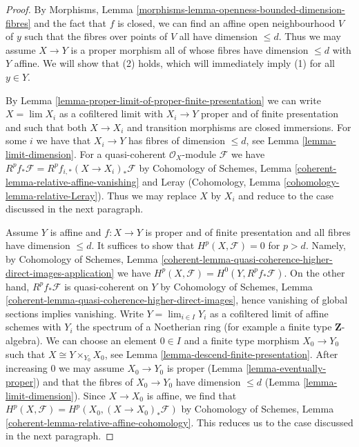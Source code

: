 \documentclass[10pt,a4paper]{amsart}
\theoremstyle{plain}
\theoremstyle{definition}
\theoremstyle{remark}
\numberwithin{equation}{subsection}
\def\lim{\mathop{\mathrm{lim}}\nolimits}
\begin{document}
\begin{proof}
By Morphisms, Lemma
\ref{morphisms-lemma-openness-bounded-dimension-fibres}
and the fact that $f$ is closed, we can find an affine open neighbourhood
$V$ of $y$ such that the fibres over points of $V$ all have dimension
$\leq d$. Thus we may assume $X \to Y$ is a proper morphism all
of whose fibres have dimension $\leq d$ with $Y$ affine.
We will show that (2) holds, which will immediately imply (1)
for all $y \in Y$.

\medskip\noindent
By Lemma \ref{lemma-proper-limit-of-proper-finite-presentation}
we can write $X = \lim X_i$ as a cofiltered limit with $X_i \to Y$ proper
and of finite presentation and such that both $X \to X_i$
and transition morphisms are closed immersions.
For some $i$ we have that $X_i \to Y$ has fibres of dimension $\leq d$,
see Lemma \ref{lemma-limit-dimension}.
For a quasi-coherent $\mathcal{O}_X$-module $\mathcal{F}$ we have
$R^pf_*\mathcal{F} = R^pf_{i, *}(X \to X_i)_*\mathcal{F}$ by
Cohomology of Schemes, Lemma \ref{coherent-lemma-relative-affine-vanishing}
and Leray (Cohomology, Lemma \ref{cohomology-lemma-relative-Leray}).
Thus we may replace $X$ by $X_i$ and
reduce to the case discussed in the next paragraph.

\medskip\noindent
Assume $Y$ is affine and $f : X \to Y$ is proper and of finite presentation
and all fibres have dimension $\leq d$. It suffices to show that
$H^p(X, \mathcal{F}) = 0$ for $p > d$. Namely, by
Cohomology of Schemes, Lemma
\ref{coherent-lemma-quasi-coherence-higher-direct-images-application}
we have $H^p(X, \mathcal{F}) = H^0(Y, R^pf_*\mathcal{F})$.
On the other hand, $R^pf_*\mathcal{F}$ is quasi-coherent on $Y$
by Cohomology of Schemes, Lemma
\ref{coherent-lemma-quasi-coherence-higher-direct-images},
hence vanishing of global sections implies vanishing.
Write $Y = \lim_{i \in I} Y_i$ as a cofiltered limit of affine schemes
with $Y_i$ the spectrum of a Noetherian ring
(for example a finite type $\mathbf{Z}$-algebra).
We can choose an element $0 \in I$ and a finite type morphism
$X_0 \to Y_0$ such that $X \cong Y \times_{Y_0} X_0$, see
Lemma \ref{lemma-descend-finite-presentation}.
After increasing $0$ we may assume $X_0 \to Y_0$ is proper
(Lemma \ref{lemma-eventually-proper})
and that the fibres of $X_0 \to Y_0$ have dimension $\leq d$
(Lemma \ref{lemma-limit-dimension}).
Since $X \to X_0$ is affine, we find that
$H^p(X, \mathcal{F}) = H^p(X_0, (X \to X_0)_*\mathcal{F})$ by
Cohomology of Schemes, Lemma \ref{coherent-lemma-relative-affine-cohomology}.
This reduces us to the case discussed in the next paragraph.


\end{proof}
\end{document}
